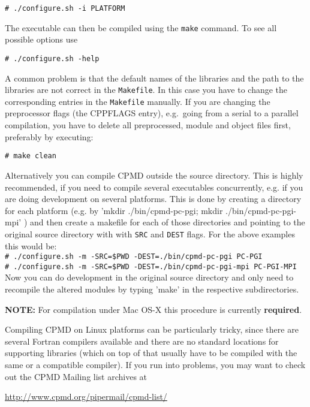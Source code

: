 \documentclass[twoside,10pt,titlepage,a4paper]{article}
\newcommand{\htref}[2]{\href{#1}{#2}}
\newcommand{\htref}[2]{\htmladdnormallink{#2}{#1}}
\newcommand{\shellcommand}[1]{%
  \vspace*{3mm}
  \noindent
  \texttt{\# #1}
  \vspace*{3mm}
}
\begin{document}
\shellcommand{./configure.sh -i PLATFORM}

The executable can then be compiled using the \texttt{make} command. 
To see all possible options use

\shellcommand{./configure.sh -help}

A common problem is that the default names of the libraries and the path to
the libraries are not correct in the \texttt{Makefile}. In this case you
have to change the corresponding entries in the \texttt{Makefile} manually.
If you are changing the preprocessor flags (the CPPFLAGS entry), 
e.g.\ going from a serial to a parallel compilation, you have to delete 
all preprocessed, module and object files first, preferably by executing:

\shellcommand{make clean}

\vspace{3mm}
  Alternatively you can compile CPMD outside the source directory.
  This is highly recommended, if you need to compile several executables
  concurrently, e.g. if you are doing development on several platforms.
  This is done by creating a directory for each platform
  (e.g. by 'mkdir ./bin/cpmd-pc-pgi; mkdir ./bin/cpmd-pc-pgi-mpi'  ) and then
  create a makefile for each of those directories and pointing to the
  original source directory with with \texttt{SRC} and \texttt{DEST}
  flags. For the above examples this would be:\\
\shellcommand{./configure.sh -m -SRC=\$PWD -DEST=./bin/cpmd-pc-pgi PC-PGI}\\
\shellcommand{./configure.sh -m -SRC=\$PWD -DEST=./bin/cpmd-pc-pgi-mpi  PC-PGI-MPI}\\
  Now you can do development in the original source directory and only
  need to recompile the altered modules by typing 'make' in the
  respective subdirectories.

\textbf{NOTE:} For compilation under Mac OS-X this procedure is
  currently \textbf{required}.


\vspace{3mm}
  Compiling CPMD on Linux platforms can be particularly tricky,
  since there are several Fortran compilers available and there
  are no standard locations for supporting libraries (which on top
  of that usually have to be compiled with the same or a compatible
  compiler). If you run into problems, you may want to check out the
  CPMD Mailing list archives at

  \centerline{\htref{http://www.cpmd.org/pipermail/cpmd-list/}{http://www.cpmd.org/pipermail/cpmd-list/}}
\end{document}
